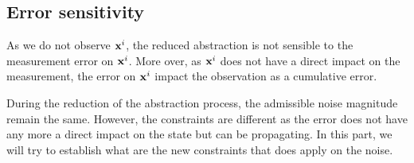 \newcommand{\xo}{\vect{x}^o}%
\newcommand{\xr}{\vect{x}^r}%

\newcommand{\Ao}{A_o}%
\newcommand{\Ar}{A_r}%
\newcommand{\Aro}{A_{ro}}%

\newcommand{\Bo}{B_o}%
\newcommand{\Br}{B_r}%

\newcommand{\Eo}{E_o}%
\newcommand{\Er}{E_r}%
\newcommand{\Ero}{E_{ro}}%

\newcommand{\Xr}{X_r}%

\newcommand{\Xrinv}{\mathcal{X}_r}%
\newcommand{\xrinf}{\minf{\x}_r}%
\newcommand{\xrsup}{\msup{\x}_r}%


\newcommand{\Wsup}{\msup{W}}
\newcommand{\Winf}{\minf{W}}
\newcommand{\Wk}{W_k}

\renewcommand{\wr}{\vect{w}^r}
\newcommand{\wrsup}{\msup{\vect{w}}^r}
\newcommand{\wrinf}{\minf{\vect{w}}^r}
\newcommand{\Wrsup}{\msup{W}^r}
\newcommand{\Wrinf}{\minf{W}^r}
\newcommand{\Wrk}{W^r_k}

\newcommand{\z}{\vect{z}}%
\newcommand{\zk}{\z_k}%
\newcommand{\zkn}{\z_{k+1}}%

\newcommand{\xkn}{\x_{k+1}}%
\newcommand{\xk}{\x_{k}}%
\newcommand{\uk}{\u_{k}}%
\newcommand{\wk}{\w_{k}}%
\newcommand{\yk}{\y_{k}}%
\newcommand{\ykn}{\y_{k+1}}%

\newcommand{\Z}{\mathbf{z}}
\newcommand{\Zk}{\Z_k}
\newcommand{\Zkn}{\Z_{k+1}}
\newcommand{\hk}{\vect{h}_{k}}
\newcommand{\h}{\vect{h}}
\newcommand{\wnoise}{\msup{\sigma}}

\newcommand{\size}{N}
\newcommand{\norminf}[1]{\left\|#1\right\|_{\infty}}


\subsection{Error sensitivity}
As we do not observe $ \mathbf{x}^i$, the reduced abstraction is not sensible to the measurement error on $ \mathbf{x}^i$. More over, as $ \mathbf{x}^i$ does not have a direct impact on the measurement, the error on $ \mathbf{x}^i$ impact the observation as a cumulative error.

During the reduction of the abstraction process, the admissible noise magnitude remain the same. However, the constraints are different as the error does not have any more a direct impact on the state but can be propagating.
In this part, we will try to establish what are the new constraints that does apply on the noise.


